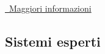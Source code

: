 \begin{frame}[t,fragile]
{\begin{minipage}[b]{\textwidth}
		\begin{center}
			\href{http://www.computer-timeline.com/timeline/logic-theorist-simon-newell-and-shaw/}{\faExternalLinkSquare\ Maggiori informazioni}
		\end{center}
	\end{minipage}
}
\end{frame}
%
\subsection{Sistemi esperti}
\label{subsec:appendix-expert-systems}
%
